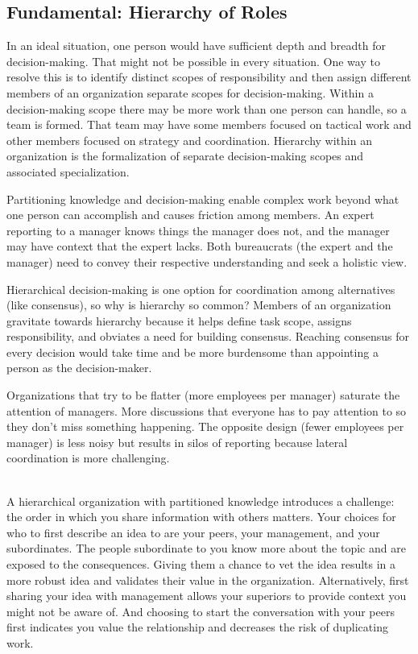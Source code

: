 \subsection*{Fundamental: Hierarchy of Roles\label{sec:hierarchy-of-roles}}


In an ideal situation, one person would have sufficient depth and breadth for decision-making. That might not be possible in every situation. One way to resolve this is to identify distinct scopes of responsibility and then assign different members of an organization separate scopes for decision-making. Within a decision-making scope there may be more work than one person can handle, so a team is formed. That team may have some members focused on tactical work and other members focused on strategy and coordination. Hierarchy within an organization is the formalization of separate decision-making scopes and associated specialization. 

Partitioning knowledge and decision-making enable complex work beyond what one person can accomplish and causes friction among members. An expert reporting to a manager knows things the manager does not, and the manager may have context that the expert lacks. Both bureaucrats (the expert and the manager) need to convey their respective understanding and seek a holistic view.

Hierarchical decision-making is one option for coordination among alternatives (like consensus), so why is hierarchy so common? Members of an organization gravitate towards hierarchy because it helps define task scope, assigns responsibility, and obviates a need for building consensus. Reaching consensus for every decision would take time and be more burdensome than appointing a person as the decision-maker.

Organizations that try to be flatter (more employees per manager) saturate the attention of managers. More discussions that everyone has to pay attention to so they don't miss something happening. The opposite design (fewer employees per manager) is less noisy but results in silos of reporting because lateral coordination is more challenging.

\ \\

A hierarchical organization with partitioned knowledge introduces a challenge: the order in which you share information with others matters. Your choices for who to first describe an idea to are your peers, your management, and your subordinates. 
The people subordinate to you know more about the topic and are exposed to the consequences. Giving them a chance to vet the idea results in a more robust idea and validates their value in the organization. Alternatively, first sharing your idea with management  allows your superiors to provide context you might not be aware of. And choosing to  start the conversation with your peers first indicates you value the relationship and decreases the risk of duplicating work.

